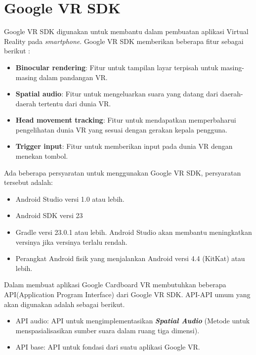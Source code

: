 \section{Google VR SDK}
\label{sec:google_vr_sdk}
Google VR SDK\cite{google_vr_developers} digunakan untuk membantu dalam pembuatan aplikasi Virtual Reality pada \textit{smartphone}. Google VR SDK memberikan beberapa fitur sebagai berikut :
\begin{itemize}
	\item \textbf{Binocular rendering}: Fitur untuk tampilan layar terpisah untuk masing-masing dalam pandangan VR.
	\item \textbf{Spatial audio}: Fitur untuk mengeluarkan suara yang datang dari daerah-daerah tertentu dari dunia VR.
	\item \textbf{Head movement tracking}: Fitur untuk mendapatkan memperbaharui pengelihatan dunia VR yang sesuai dengan gerakan kepala pengguna.
	\item \textbf{Trigger input}: Fitur untuk memberikan input pada dunia VR dengan menekan tombol.
\end{itemize}

Ada beberapa persyaratan untuk menggunakan Google VR SDK, persyaratan tersebut adalah:
\begin{itemize}
	\item Android Studio versi 1.0 atau lebih.
	\item Android SDK versi 23
	\item Gradle versi 23.0.1 atau lebih. Android Studio akan membantu meningkatkan versinya jika versinya terlalu rendah.
	\item Perangkat Android fisik yang menjalankan Android versi 4.4 (KitKat) atau lebih.
\end{itemize}

Dalam membuat aplikasi Google Cardboard VR membutuhkan beberapa API(Application Program Interface) dari Google VR SDK. API-API umum yang akan digunakan adalah sebagai berikut. 
\begin{itemize}
	\item API audio: API untuk mengimplementasikan \textbf{\textit{Spatial Audio}} (Metode untuk menspasialisasikan sumber suara dalam ruang tiga dimensi).
	\item API base: API untuk fondasi dari suatu aplikasi Google VR.
\end{itemize}

